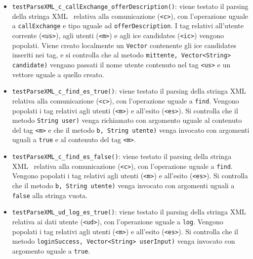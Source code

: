 {\begin{sloppypar}
{{\begin{itemize}
\begin{itemize}
\begin{itemize}
						\item \texttt{testParseXML\_c\_callExchange\_offerDescription()}: viene testato il parsing della stringa XML\g~ relativa alla comunicazione (\texttt{<c>}), con l'operazione uguale a \texttt{callExchange} e tipo uguale ad \texttt{offerDescription}. I tag relativi all'utente corrente (\texttt{<us>}), agli utenti (\texttt{<m>}) e agli ice candidates (\texttt{<ic>}) vengono popolati. Viene creato localmente un \texttt{Vector} contenente gli ice candidates inseriti nei tag, e si controlla che al metodo  \texttt{mittente, Vector<String> candidate)} vengano passati il nome utente contenuto nel tag \texttt{<us>} e un vettore uguale a quello creato.
						
						\item \texttt{testParseXML\_c\_find\_es\_true()}: viene testato il parsing della stringa XML\g~ relativa alla comunicazione (\texttt{<c>}), con l'operazione uguale a \texttt{find}. Vengono popolati i tag relativi agli utenti (\texttt{<m>}) e all'esito (\texttt{<es>}). Si controlla che il metodo  \texttt{String user)} venga richiamato con argomento uguale al contenuto del tag \texttt{<m>} e che il metodo  \texttt{b, String utente)} venga invocato con argomenti uguali a \texttt{true} e al contenuto del tag \texttt{<m>}.
						
						\item \texttt{testParseXML\_c\_find\_es\_false()}: viene testato il parsing della stringa XML\g~ relativa alla comunicazione (\texttt{<c>}), con l'operazione uguale a \texttt{find}. Vengono popolati i tag relativi agli utenti (\texttt{<m>}) e all'esito (\texttt{<es>}). Si controlla che il metodo   \texttt{b, String utente)} venga invocato con argomenti uguali a \texttt{false} alla stringa vuota.
						
						\item \texttt{testParseXML\_ud\_log\_es\_true()}: viene testato il parsing della stringa XML\g~ relativa ai dati utente (\texttt{<ud>}), con l'operazione uguale a \texttt{log}. Vengono popolati i tag relativi agli utenti (\texttt{<m>}) e all'esito (\texttt{<es>}). Si controlla che il metodo   \texttt{loginSuccess, Vector<String> userInput)} venga invocato con argomento uguale a \texttt{true}.
						

\end{itemize}
\end{itemize}
\end{itemize}}}
\end{sloppypar}}
